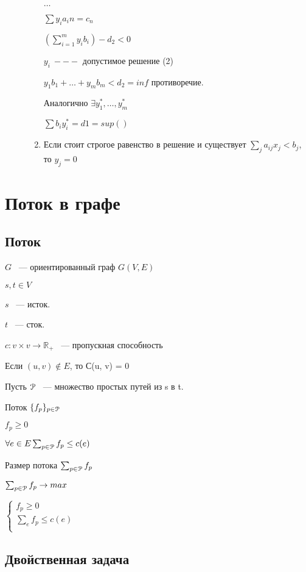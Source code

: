 \documentclass[12pt]{article}
\begin{document}
\begin{description}
\begin{enumerate}
$\ldots$

$\sum y_i a_in = c_n$

$(\sum_{i = 1}^{m} y_i b_i) - d_2 < 0$

$y_i ~---$ допустимое решение (2)

$y_1b_1 + \ldots + y_mb_m < d_2 = inf$ противоречие. 

Аналогично $\exists y_1^*, \ldots,y_m^* $

$\sum b_iy_i^* = d1 = sup()$
\item Если стоит строгое равенство в решение и существует $\sum_{j}a_{ij}x_j < b_j $, то $y_j  = 0$
\end{enumerate}

\end{description}

\section{Поток в графе}

\subsection{Поток}

$G$ ~--- ориентированный граф $G(V, E)$

$s, t \in V$

$s$ ~--- исток.

$t$ ~--- сток. 

$c: v \times v \to \mathbb R_{+}$ ~--- пропускная способность

Если $(u, v) \notin E$, то С(u, v) = 0

Пусть $\EuScript P$ ~--- множество простых путей из s в t.

Поток $\{f_p\}_{p \in \EuScript P}$

$f_p \ge 0$

$\forall e \in E \sum_{p \in \EuScript P}f_p \le c(e)$

Размер потока $\sum_{p \in \EuScript P}f_p$

$\sum_{p \in \EuScript P} f_p \to max$

$\begin{cases} f_p \ge 0\\ \sum_e f_p \le c(e)\\ \end{cases}$

\subsection{Двойственная задача}
\end{document}
